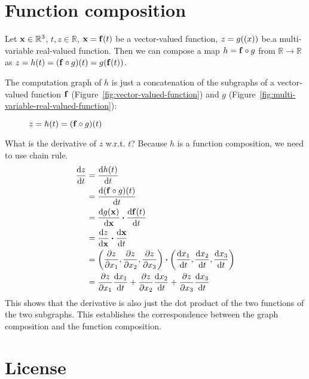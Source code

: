 \documentclass[11pt]{article}
\newcommand{\numset}[1]{\mathbb{#1}}
\newcommand{\compo}{\circ}
\begin{document}
\section{Function composition}

Let $\vb{x} \in \numset{R}^3$, $t, z \in \numset{R}$, $\vb{x} = \vb{f}(t)$ be a vector-valued function, $z = g(\vb(x))$ be.a multi-variable real-valued function.  Then we can compose a map $h = \vb{f} \compo g$ from $\numset{R} \rightarrow \numset{R}$ as $z = h(t) = \qty(\vb{f} \compo g)(t) = g(\vb{f}(t))$.

The computation graph of $h$ is just a concatenation of the subgraphs of a vector-valued function $\vb{f}$ (Figure~\ref{fig:vector-valued-function}) and $g$ (Figure~\ref{fig:multi-variable-real-valued-function}):
\begin{figure}[h]
		\centering
		\caption{$z = h(t) = (\vb{f} \compo g)(t)$}
\end{figure}

What is the derivative of $z$ w.r.t. $t$? Because $h$ is a function composition, we need to use chain rule.
\begin{align}
	\dv{z}{t} &= \dv{h(t)}{t} \\
	&= \dv{(\vb{f} \compo g)(t)}{t} \\
	&= \dv{g(\vb{x})}{\vb{x}} \vdot \dv{\vb{f}(t)}{t} \\
	&= \dv{z}{\vb{x}} \vdot \dv{\vb{x}}{t} \\
	&= \qty(\pdv{z}{x_1}, \pdv{z}{x_2}, \pdv{z}{x_3}) \vdot \qty(\dv{x_1}{t}, \dv{x_2}{t}, \dv{x_3}{t}) \\
	&= \pdv{z}{x_1}\dv{x_1}{t} + \pdv{z}{x_2}\dv{x_2}{t} + \pdv{z}{x_3}\dv{x_3}{t}
\end{align}
This shows that the derivative is also just the dot product of the two functions of the two subgraphs.  This establishes the correspondence between the graph composition and the function composition.


\section{License}
\doclicenseThis
\end{document}
